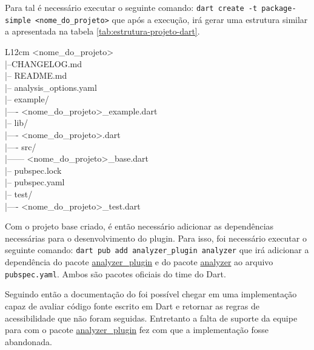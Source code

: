 Para tal é necessário executar o seguinte comando: \texttt{dart create -t package-simple <nome\_do\_projeto>} que após a execução, irá gerar uma estrutura similar a apresentada na tabela \ref{tab:estrutura-projeto-dart}.

\begin{table}[!htbp]
	\centering
	\renewcommand{\arraystretch}{1.1}
	\caption{Estrutura de um projeto Dart utilizando o template de pacote}
	\label{tab:estrutura-projeto-dart}
	\ttfamily
	\begin{tabular}{ L{12cm} }
		\hline
		<nome\_do\_projeto> \\
		|--CHANGELOG.md \\
		|-- README.md \\
		|-- analysis\_options.yaml \\
		|-- example/ \\
		|---- <nome\_do\_projeto>\_example.dart \\
		|-- lib/ \\
		|---- <nome\_do\_projeto>.dart \\
		|---- src/ \\
		|------ <nome\_do\_projeto>\_base.dart \\
		|-- pubspec.lock \\
		|-- pubspec.yaml \\
		|-- test/ \\
		|---- <nome\_do\_projeto>\_test.dart \\
		\hline
	\end{tabular}
	\fontfamily{\rmdefault}\selectfont
	\vspace{2mm}
\end{table}

Com o projeto base criado, é então necessário adicionar as dependências necessárias para o desenvolvimento do plugin. Para isso, foi necessário executar o seguinte comando: \texttt{dart pub add analyzer\_plugin analyzer} que irá adicionar a dependência do pacote \href{https://pub.dev/packages/analyzer_plugin}{analyzer\_plugin} e do pacote \href{https://pub.dev/packages/analyzer}{analyzer} ao arquivo \texttt{pubspec.yaml}. Ambos são pacotes oficiais do time do Dart.

Seguindo então a documentação do \cite{documentacaoanalyzerplugin} foi possível chegar em uma implementação capaz de avaliar código fonte escrito em Dart e retornar as regras de acessibilidade que não foram seguidas. Entretanto a falta de suporte da equipe para com o pacote \href{https://pub.dev/packages/analyzer_plugin}{analyzer\_plugin} fez com que a implementação fosse abandonada. 

